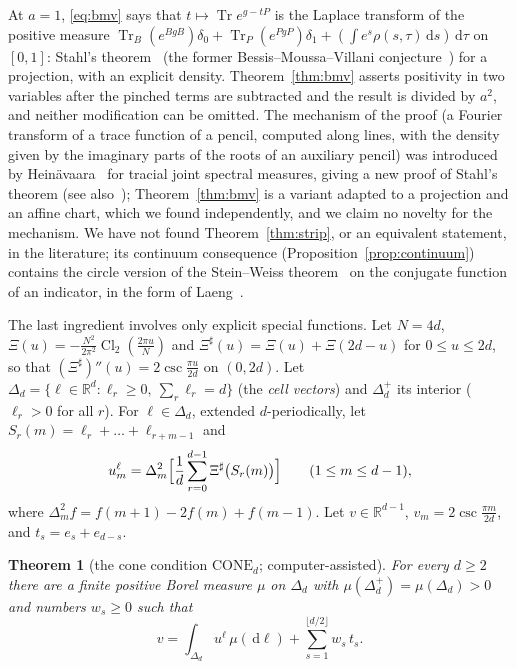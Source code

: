 \documentclass[11pt]{article}
\newtheorem{theorem}{Theorem}
\theoremstyle{remark}
\numberwithin{equation}{section}
\newcommand{\R}{\mathbb{R}}
\newcommand{\Tr}{\operatorname{Tr}}
\newcommand{\Cl}{\operatorname{Cl}_2}
\newcommand{\Sh}{\Xi^{\sharp}}
\newcommand{\dd}{\,\mathrm{d}}
\newcommand{\CONE}{\mathrm{CONE}}
\begin{document}
At $a=1$, \eqref{eq:bmv} says that $t\mapsto\Tr e^{g-tP}$ is the Laplace transform of the positive measure
$\Tr_B(e^{BgB})\delta_0+\Tr_P(e^{PgP})\delta_1+(\int e^s\rho(s,\tau)\dd s)\dd\tau$ on $[0,1]$: Stahl's
theorem~\cite{Stahl} (the former Bessis--Moussa--Villani conjecture~\cite{BMV}) for a projection, with an explicit
density. Theorem~\ref{thm:bmv} asserts positivity in two variables after the pinched terms are subtracted and the result
is divided by $a^2$, and neither modification can be omitted. The mechanism of the proof (a Fourier transform of a
trace function of a pencil, computed along lines, with the density given by the imaginary parts of the roots of an
auxiliary pencil) was introduced by Hein\"avaara~\cite{He} for tracial joint spectral measures, giving a new proof of
Stahl's theorem (see also~\cite{Eremenko,LS}); Theorem~\ref{thm:bmv} is a variant adapted to a projection and an affine
chart, which we found independently, and we claim no novelty for the mechanism. We have not found
Theorem~\ref{thm:strip}, or an equivalent statement, in the literature; its continuum consequence
(Proposition~\ref{prop:continuum}) contains the circle version of the Stein--Weiss theorem~\cite{SW} on the conjugate
function of an indicator, in the form of Laeng~\cite{Laeng}.

The last ingredient involves only explicit special functions. Let $N=4d$, $\Xi(u)=-\frac{N^2}{2\pi^2}\Cl(\frac{2\pi
u}N)$ and $\Sh(u)=\Xi(u)+\Xi(2d-u)$ for $0\le u\le2d$, so that $(\Sh)''(u)=2\csc\frac{\pi u}{2d}$ on $(0,2d)$. Let
$\Delta_d=\{\ell\in\R^d:\ell_r\ge0,\ \sum_r\ell_r=d\}$ (the \emph{cell vectors}) and $\Delta_d^+$ its interior
($\ell_r>0$ for all $r$). For $\ell\in\Delta_d$, extended $d$-periodically, let $S_r(m)=\ell_r+\dots+\ell_{r+m-1}$ and
\begin{equation}\label{eq:uell}
u^\ell_m=\Delta^2_m\Bigl[\frac1d\sum_{r=0}^{d-1}\Sh\bigl(S_r(m)\bigr)\Bigr]\qquad(1\le m\le d-1),
\end{equation}
where $\Delta^2_mf=f(m+1)-2f(m)+f(m-1)$. Let $v\in\R^{d-1}$, $v_m=2\csc\frac{\pi m}{2d}$, and $t_s=e_s+e_{d-s}$.

\begin{theorem}[the cone condition $\CONE_d$; computer-assisted]\label{thm:cone}
For every $d\ge2$ there are a finite positive Borel measure $\mu$ on $\Delta_d$ with $\mu(\Delta_d^+)=\mu(\Delta_d)>0$
and numbers $w_s\ge0$ such that
\begin{equation}\label{eq:cone}
v=\int_{\Delta_d}u^\ell\,\mu(\dd\ell)+\sum_{s=1}^{\lfloor d/2\rfloor}w_s\,t_s .
\end{equation}
\end{theorem}
\end{document}

